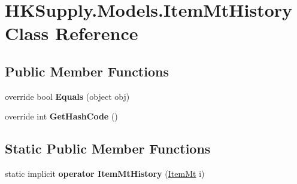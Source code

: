 \hypertarget{class_h_k_supply_1_1_models_1_1_item_mt_history}{}\section{H\+K\+Supply.\+Models.\+Item\+Mt\+History Class Reference}
\label{class_h_k_supply_1_1_models_1_1_item_mt_history}
\subsection*{Public Member Functions}
\begin{DoxyCompactItemize}
\item 
\mbox{\label{class_h_k_supply_1_1_models_1_1_item_mt_history_a577520936da6468733b52039e99b4590}} 
override bool {\bfseries Equals} (object obj)
\item 
\mbox{\label{class_h_k_supply_1_1_models_1_1_item_mt_history_afffef591e15a3c842db6806c465d3463}} 
override int {\bfseries Get\+Hash\+Code} ()
\end{DoxyCompactItemize}
\subsection*{Static Public Member Functions}
\begin{DoxyCompactItemize}
\item 
\mbox{\label{class_h_k_supply_1_1_models_1_1_item_mt_history_ae727bf3326ba2c0189eb2b9f28bc5567}} 
static implicit {\bfseries operator Item\+Mt\+History} (\mbox{\hyperlink{class_h_k_supply_1_1_models_1_1_item_mt}{Item\+Mt}} i)
\end{DoxyCompactItemize}
